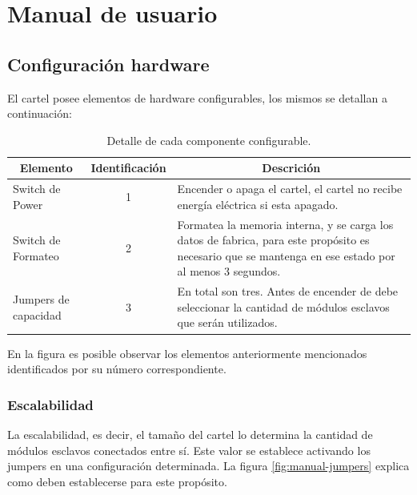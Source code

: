 \section{Manual de usuario} \label{sec:manual-usuario}

\subsection{Configuración hardware}

El cartel posee elementos de hardware configurables, los mismos se detallan a continuación:

\begin{table}[ht!]
	\centering
	\caption{Detalle de cada componente configurable.}
	\label{my-label}
	\begin{tabular}{lcp{}}
		\multicolumn{1}{c}{Elemento}	& Identificación & \multicolumn{1}{c}{Descrición} \\ \hline
		Switch de Power         		& 1              & Encender o apaga el cartel, el cartel no recibe energía eléctrica si esta apagado. \\ \hline
		Switch de Formateo      		& 2              & Formatea la memoria interna, y se carga los datos de fabrica, para este propósito es necesario que se mantenga en ese estado por al menos 3 segundos. \\ \hline
		Jumpers de capacidad 			& 3              & En total son tres. Antes de encender de debe seleccionar la cantidad de módulos esclavos que serán utilizados. \\ \hline
	\end{tabular}
\end{table}

En la figura es posible observar los elementos anteriormente mencionados identificados por su número correspondiente.

\subsubsection{Escalabilidad}
La escalabilidad, es decir, el tamaño del cartel lo determina la cantidad de módulos esclavos conectados entre sí. Este valor se establece activando los jumpers en una configuración determinada. La figura \ref{fig:manual-jumpers} explica como deben establecerse para este propósito.

